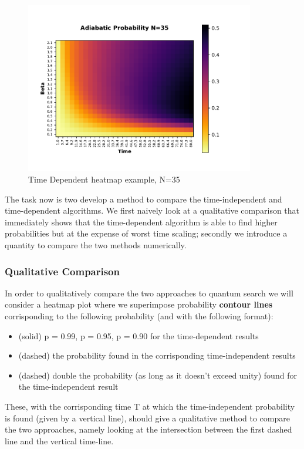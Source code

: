 \documentclass[aps,pra,reprint, onecolumn, showkeys]{revtex4-2}
\begin{document}
\begin{figure}[ht]
\includegraphics[width=10cm]{./figures/example.pdf}%
\caption{Time Dependent heatmap example, N=35}
\end{figure}

The task now is two develop a method to compare the time-independent and time-dependent algorithms. We first naively look at a qualitative comparison that immediately shows that the time-dependent algorithm is able to find higher probabilities but at the expense of worst time scaling; secondly we introduce a quantity to compare the two methods numerically.

\subsubsection{Qualitative Comparison}
In order to qualitatively compare the two approaches to quantum search we will consider a heatmap plot where we superimpose probability \textbf{contour lines} corrisponding to the following probability (and with the following format):
\begin{itemize}
  \item (solid) p = 0.99, p = 0.95, p = 0.90 for the time-dependent results
  \item (dashed) the probability found in the corrisponding time-independent results
  \item (dashed) double the probability (as long as it doesn't exceed unity) found for the time-independent
 result
\end{itemize}
These, with the corrisponding time T at which the time-independent probability is found (given by a vertical line), should give a qualitative method to compare the two approaches, namely looking at the intersection between the first dashed line and the vertical time-line.\\
\end{document}
